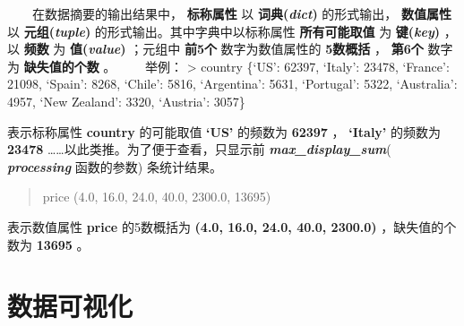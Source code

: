 \documentclass[11pt]{article}
\begin{document}
      在数据摘要的输出结果中， \textbf{标称属性} 以
\textbf{词典(\emph{dict})} 的形式输出， \textbf{数值属性} 以
\textbf{元组(\emph{tuple})} 的形式输出。其中字典中以标称属性
\textbf{所有可能取值} 为 \textbf{键(\emph{key})} ，以 \textbf{频数} 为
\textbf{值(\emph{value})} ；元组中 \textbf{前5个} 数字为数值属性的
\textbf{5数概括} ， \textbf{第6个} 数字为 \textbf{缺失值的个数} 。
  举例： \textgreater{} country \{`US': 62397, `Italy': 23478, `France':
21098, `Spain': 8268, `Chile': 5816, `Argentina': 5631, `Portugal':
5322, `Australia': 4957, `New Zealand': 3320, `Austria': 3057\}

表示标称属性 \textbf{country} 的可能取值 \textbf{`US'} 的频数为
\textbf{62397} ， \textbf{`Italy'} 的频数为 \textbf{23478}
\ldots\ldots 以此类推。为了便于查看，只显示前
\textbf{\emph{max\_display\_sum}}( \textbf{\emph{processing}}
函数的参数) 条统计结果。

\begin{quote}
price (4.0, 16.0, 24.0, 40.0, 2300.0, 13695)
\end{quote}

表示数值属性 \textbf{price} 的5数概括为 \textbf{(4.0, 16.0, 24.0, 40.0,
2300.0)} ，缺失值的个数为 \textbf{13695} 。

    \hypertarget{ux6570ux636eux53efux89c6ux5316}{%
\section{数据可视化}\label{ux6570ux636eux53efux89c6ux5316}}
\end{document}
